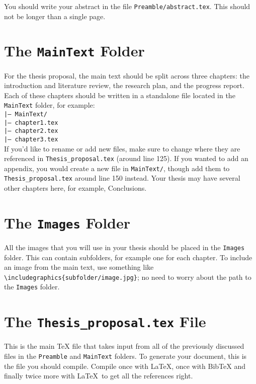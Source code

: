 You should write your abstract in the file \texttt{Preamble/abstract.tex}. This
should not be longer than a single page.

\section{The \texttt{MainText} Folder}

For the thesis proposal, the main text should be split across three chapters:
the introduction and literature review, the research plan, and the progress report.
Each of these chapters should be written in a standalone file located in
the \texttt{MainText} folder, for example:
\texttt{
\\
|--- MainText/ \\ 
\hspace*{0.5cm}|--- chapter1.tex\\
\hspace*{0.5cm}|--- chapter2.tex\\
\hspace*{0.5cm}|--- chapter3.tex\\
}
If you'd like to rename or add new files, make sure to change where they are
referenced in \texttt{Thesis\_proposal.tex} (around line 125). If you wanted
to add an appendix, you would create a new file in \texttt{MainText/}, though
add them to \texttt{Thesis\_proposal.tex} around line 150 instead.
Your thesis may have several other chapters here, for example, Conclusions.

\section{The \texttt{Images} Folder}

All the images that you will use in your thesis should be placed in the \texttt{Images}
folder. This can contain subfolders, for example one for each chapter. To include
an image from the main text, use something like
\texttt{\textbackslash includegraphics\{subfolder/image.jpg\}}; no need to
worry about the path to the \texttt{Images} folder.

\section{The \texttt{Thesis\_proposal.tex} File}

This is the main TeX file that takes input from all of the previously discussed
files in the \texttt{Preamble} and \texttt{MainText} folders. To generate your
document, this is the file you should compile. Compile once with \LaTeX,
once with BibTeX and finally twice more with \LaTeX\ to get all the references right.

